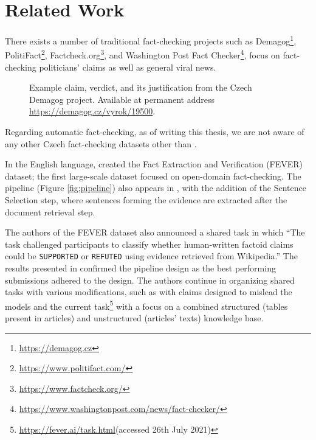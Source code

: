 \section{Related Work}

There exists a number of traditional fact-checking projects such as Demagog\footnote{\url{https://demagog.cz}}, PolitiFact\footnote{\url{https://www.politifact.com/}}, Factcheck.org\footnote{\url{https://www.factcheck.org/}}, and Washington Post Fact Checker\footnote{\url{https://www.washingtonpost.com/news/fact-checker/}}, focus on fact-checking politicians' claims as well as general viral news. 

\begin{figure}[h!]
    \caption[Czech Demagog Entry Example]{Example claim, verdict, and its justification from the Czech Demagog project. Available at permanent address \url{https://demagog.cz/vyrok/19500}.}
\end{figure}

Regarding automatic fact-checking, as of writing this thesis, we are not aware of any other Czech fact-checking datasets other than \citep{czech-fact}.

In the English language, \citet{fever} created the Fact Extraction and Verification (FEVER) dataset; the first large-scale dataset focused on open-domain fact-checking.
The pipeline (Figure \ref{fig:pipeline}) also appears in \citep{fever}, with the addition of the Sentence Selection step, where sentences forming the evidence are extracted after the document retrieval step.

The authors of the FEVER dataset also announced a shared task \citep{fever-2018-shared-task} in which ``The task challenged participants to classify whether human-written factoid claims could be \texttt{SUPPORTED} or \texttt{REFUTED} using evidence retrieved from Wikipedia.'' The results presented in \citep{fever-2018-shared-task} confirmed the pipeline design as the best performing submissions adhered to the design. The authors continue in organizing shared tasks with various modifications, such as \citep{fever-2019-shared-task-adversial} with claims designed to mislead the models and the current task\footnote{\url{https://fever.ai/task.html}(accessed 26th July 2021)} with a focus on a combined structured (tables present in articles) and unstructured (articles' texts) knowledge base.



